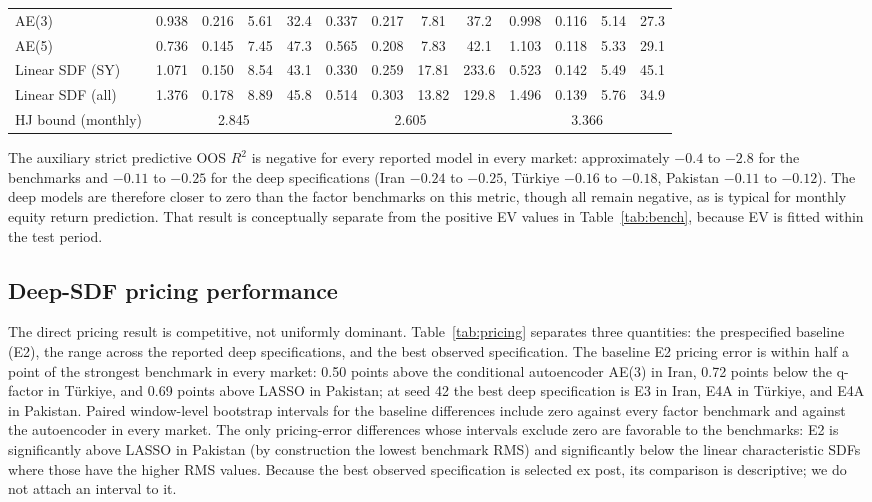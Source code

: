 \documentclass[12pt]{article}
\begin{document}
\begin{table}[htbp]
\begin{tabular}{l cccc cccc cccc}
AE(3) & 0.938 & 0.216 & 5.61 & 32.4 & 0.337 & 0.217 & 7.81 & 37.2 & 0.998 & 0.116 & 5.14 & 27.3 \\
AE(5) & 0.736 & 0.145 & 7.45 & 47.3 & 0.565 & 0.208 & 7.83 & 42.1 & 1.103 & 0.118 & 5.33 & 29.1 \\
Linear SDF (SY) & 1.071 & 0.150 & 8.54 & 43.1 & 0.330 & 0.259 & 17.81 & 233.6 & 0.523 & 0.142 & 5.49 & 45.1 \\
Linear SDF (all) & 1.376 & 0.178 & 8.89 & 45.8 & 0.514 & 0.303 & 13.82 & 129.8 & 1.496 & 0.139 & 5.76 & 34.9 \\
\midrule
HJ bound (monthly) & \multicolumn{4}{c}{2.845} & \multicolumn{4}{c}{2.605} & \multicolumn{4}{c}{3.366} \\
\bottomrule
\end{tabular}
\end{table}

The auxiliary strict predictive OOS $R^2$ is negative for every reported model in every market: approximately $-0.4$ to $-2.8$ for the benchmarks and $-0.11$ to $-0.25$ for the deep specifications (Iran $-0.24$ to $-0.25$, T\"urkiye $-0.16$ to $-0.18$, Pakistan $-0.11$ to $-0.12$). The deep models are therefore closer to zero than the factor benchmarks on this metric, though all remain negative, as is typical for monthly equity return prediction. That result is conceptually separate from the positive EV values in Table~\ref{tab:bench}, because EV is fitted within the test period.

\subsection{Deep-SDF pricing performance}\label{sec:pricing}

The direct pricing result is competitive, not uniformly dominant. Table~\ref{tab:pricing} separates three quantities: the prespecified baseline (E2), the range across the reported deep specifications, and the best observed specification. The baseline E2 pricing error is within half a point of the strongest benchmark in every market: 0.50 points above the conditional autoencoder AE(3) in Iran, 0.72 points below the q-factor in T\"urkiye, and 0.69 points above LASSO in Pakistan; at seed 42 the best deep specification is E3 in Iran, E4A in T\"urkiye, and E4A in Pakistan. Paired window-level bootstrap intervals for the baseline differences include zero against every factor benchmark and against the autoencoder in every market. The only pricing-error differences whose intervals exclude zero are favorable to the benchmarks: E2 is significantly above LASSO in Pakistan (by construction the lowest benchmark RMS) and significantly below the linear characteristic SDFs where those have the higher RMS values. Because the best observed specification is selected ex post, its comparison is descriptive; we do not attach an interval to it.
\end{document}
